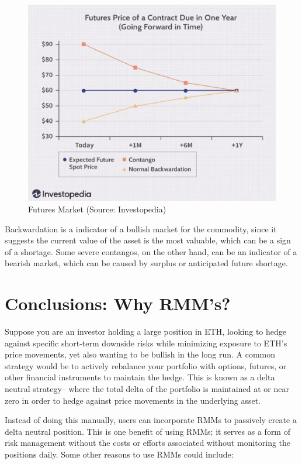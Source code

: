 \documentclass[12pt]{article}
\begin{document}
\begin{figure}[H]
    \centering
    \includegraphics[width=0.8\linewidth]{futures_market.png}
    \caption{Futures Market (Source: Investopedia)}
    \label{fig:futures}
\end{figure}

Backwardation is a indicator of a bullish market for the commodity, since it suggests the current value of the asset is the most valuable, which can be a sign of a shortage. Some severe contangos, on the other hand, can be an indicator of a bearish market, which can be caused by surplus or anticipated future shortage.

\section{Conclusions: Why RMM's?}
Suppose you are an investor holding a large position in ETH, looking to hedge against specific short-term downside risks while minimizing exposure to ETH's price movements, yet also wanting to be bullish in the long run. A common strategy would be to actively rebalance your portfolio with options, futures, or other financial instruments to maintain the hedge. This is known as a delta neutral strategy– where the total delta of the portfolio is maintained at or near zero in order to hedge against price movements in the underlying asset.

Instead of doing this manually, users can incorporate RMMs to passively create a delta neutral position. This is one benefit of using RMMs; it serves as a form of risk management without the costs or efforts associated without monitoring the positions daily. Some other reasons to use RMMs could include:
\end{document}

